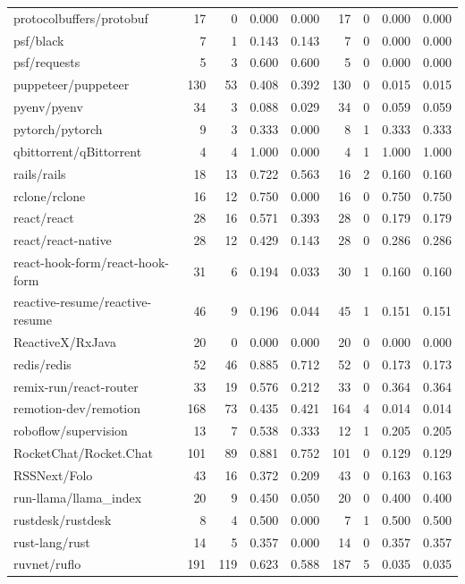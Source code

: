 \begin{tabular}{lrrrrrrrr}
protocolbuffers/protobuf & 17 & 0 & 0.000 & 0.000 & 17 & 0 & 0.000 & 0.000 \\
psf/black & 7 & 1 & 0.143 & 0.143 & 7 & 0 & 0.000 & 0.000 \\
psf/requests & 5 & 3 & 0.600 & 0.600 & 5 & 0 & 0.000 & 0.000 \\
puppeteer/puppeteer & 130 & 53 & 0.408 & 0.392 & 130 & 0 & 0.015 & 0.015 \\
pyenv/pyenv & 34 & 3 & 0.088 & 0.029 & 34 & 0 & 0.059 & 0.059 \\
pytorch/pytorch & 9 & 3 & 0.333 & 0.000 & 8 & 1 & 0.333 & 0.333 \\
qbittorrent/qBittorrent & 4 & 4 & 1.000 & 0.000 & 4 & 1 & 1.000 & 1.000 \\
rails/rails & 18 & 13 & 0.722 & 0.563 & 16 & 2 & 0.160 & 0.160 \\
rclone/rclone & 16 & 12 & 0.750 & 0.000 & 16 & 0 & 0.750 & 0.750 \\
react/react & 28 & 16 & 0.571 & 0.393 & 28 & 0 & 0.179 & 0.179 \\
react/react-native & 28 & 12 & 0.429 & 0.143 & 28 & 0 & 0.286 & 0.286 \\
react-hook-form/react-hook-form & 31 & 6 & 0.194 & 0.033 & 30 & 1 & 0.160 & 0.160 \\
reactive-resume/reactive-resume & 46 & 9 & 0.196 & 0.044 & 45 & 1 & 0.151 & 0.151 \\
ReactiveX/RxJava & 20 & 0 & 0.000 & 0.000 & 20 & 0 & 0.000 & 0.000 \\
redis/redis & 52 & 46 & 0.885 & 0.712 & 52 & 0 & 0.173 & 0.173 \\
remix-run/react-router & 33 & 19 & 0.576 & 0.212 & 33 & 0 & 0.364 & 0.364 \\
remotion-dev/remotion & 168 & 73 & 0.435 & 0.421 & 164 & 4 & 0.014 & 0.014 \\
roboflow/supervision & 13 & 7 & 0.538 & 0.333 & 12 & 1 & 0.205 & 0.205 \\
RocketChat/Rocket.Chat & 101 & 89 & 0.881 & 0.752 & 101 & 0 & 0.129 & 0.129 \\
RSSNext/Folo & 43 & 16 & 0.372 & 0.209 & 43 & 0 & 0.163 & 0.163 \\
run-llama/llama\_index & 20 & 9 & 0.450 & 0.050 & 20 & 0 & 0.400 & 0.400 \\
rustdesk/rustdesk & 8 & 4 & 0.500 & 0.000 & 7 & 1 & 0.500 & 0.500 \\
rust-lang/rust & 14 & 5 & 0.357 & 0.000 & 14 & 0 & 0.357 & 0.357 \\
ruvnet/ruflo & 191 & 119 & 0.623 & 0.588 & 187 & 5 & 0.035 & 0.035 \\

\end{tabular}
